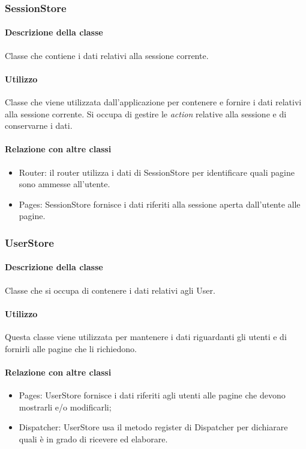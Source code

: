 \subsubsection{SessionStore}
\paragraph*{Descrizione della classe}
Classe che contiene i dati relativi alla sessione corrente.
\paragraph*{Utilizzo}
Classe che viene utilizzata dall'applicazione per contenere e fornire i dati relativi alla sessione corrente. Si occupa di gestire le \textit{action} relative alla sessione e di conservarne i dati.
\paragraph*{Relazione con altre classi}
\begin{itemize}
\item Router: il router utilizza i dati di SessionStore per identificare quali pagine sono ammesse all'utente.
\item Pages: SessionStore fornisce i dati riferiti alla sessione aperta dall'utente alle pagine.
\end{itemize}

\subsubsection{UserStore}
\paragraph*{Descrizione della classe}
Classe che si occupa di contenere i dati relativi agli User.
\paragraph*{Utilizzo}
Questa classe viene utilizzata per mantenere i dati riguardanti gli utenti e di fornirli alle pagine che li richiedono.
\paragraph*{Relazione con altre classi}
\begin{itemize}
\item Pages: UserStore fornisce i dati riferiti agli utenti alle pagine che devono mostrarli e/o modificarli;
\item Dispatcher: UserStore usa il metodo register di Dispatcher per dichiarare quali  è in grado di ricevere ed elaborare.
\end{itemize}

